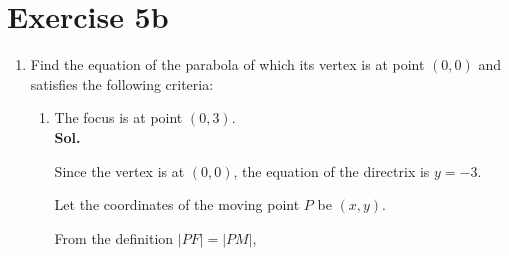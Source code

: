 \documentclass{report}
\newcommand{\sol}{\vspace{1em}\\\textbf{Sol.}}
\begin{document}
\section*{Exercise 5b}

\onehalfspacing
\begin{enumerate}[leftmargin=*]
    \item Find the equation of the parabola of which its vertex is at point $(0, 0)$ and
          satisfies the following criteria:
          \begin{enumerate}
              \item The focus is at point $(0, 3)$. \sol{}
                    \begin{multicols}{2}
                        Since the vertex is at $(0, 0)$, the equation of the directrix is $y = -3$.

                        Let the coordinates of the moving point $P$ be $(x, y)$.

                        From the definition $|PF| = |PM|$,


\end{multicols}
\end{enumerate}
\end{enumerate}
\end{document}

